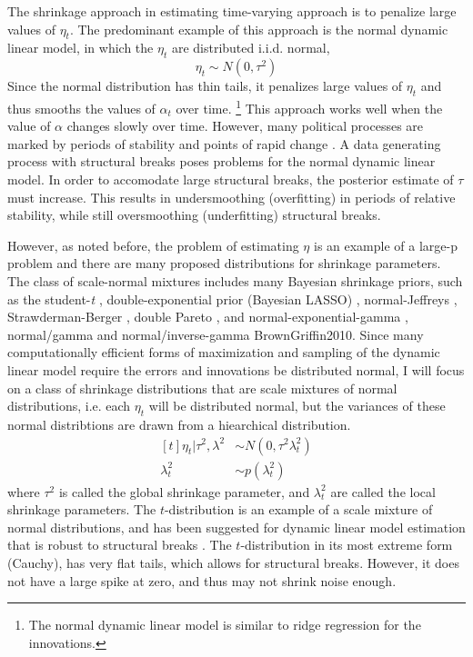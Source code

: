 \documentclass{article}
\begin{document}
The shrinkage approach in estimating time-varying approach is to penalize large values of $\eta_{t}$. 
The predominant example of this approach is the normal dynamic linear model, in which the $\eta_{t}$ are distributed i.i.d. normal,
\begin{equation}
  \label{eq:4}
  \eta_{t} \sim N(0, \tau^{2})
\end{equation}
Since the normal distribution has thin tails, it penalizes large values of $\eta_{t}$ and thus smooths the values of $\alpha_{t}$ over time.
\footnote{The normal dynamic linear model is similar to ridge regression for the innovations.}
This approach works well when the value of $\alpha$ changes slowly over time.
However, many political processes are marked by periods of stability and points of rapid change \parencite{RatkovicEng2010}.
A data generating process with structural breaks poses problems for the normal dynamic linear model.
In order to accomodate large structural breaks, the posterior estimate of $\tau$ must increase. 
This results in undersmoothing (overfitting) in periods of relative stability, while still oversmoothing (underfitting) structural breaks.

However, as noted before, the problem of estimating $\eta$ is an example of a large-p problem and there are many proposed distributions for shrinkage parameters.
The class of scale-normal mixtures includes many Bayesian shrinkage priors, such as the student-\textit{t} \parencite{Tipping2001}, double-exponential prior (Bayesian LASSO) \parencites{LiGoel2006}{ParkCasella2008}{Hans2009}, normal-Jeffreys \parencites{FigueiredoMember2003}{BaeMallick2004}, Strawderman-Berger \parencites{Strawderman1971}{Berger1980}, double Pareto \parencite{ArmaganDunsonLee2011},  and normal-exponential-gamma \parencite{BrownGriffin2005}, normal/gamma and normal/inverse-gamma \parencite{CaronDoucet2008}{BrownGriffin2010}.
Since many computationally efficient forms of maximization and sampling of the dynamic linear model require the errors and innovations be distributed normal, I will focus on a class of shrinkage distributions that are scale mixtures of normal distributions, i.e. each $\eta_{t}$ will be distributed normal, but the variances of these normal distribtions are drawn from a hiearchical distribution.
\begin{equation}
  \label{eq:6}
  \begin{aligned}[t]
    \eta_{t} | \tau^{2}, \lambda^{2} & \sim N(0, \tau^{2} \lambda_{t}^{2}) \\
    \lambda_{t}^{2} & \sim p(\lambda^{2}_{t})
  \end{aligned}
\end{equation}
where $\tau^{2}$ is called the global shrinkage parameter, and $\lambda_{t}^{2}$ are called the local shrinkage parameters.
The $t$-distribution is an example of a scale mixture of normal distributions, and has been suggested for dynamic linear model estimation that is robust to structural breaks \parencites{HarveyKoopman2000}{PetrisPetroneEtAl2009}.
The $t$-distribution in its most extreme form (Cauchy), has very flat tails, which allows for structural breaks.
However, it does not have a large spike at zero, and thus may not shrink noise enough.
\end{document}
